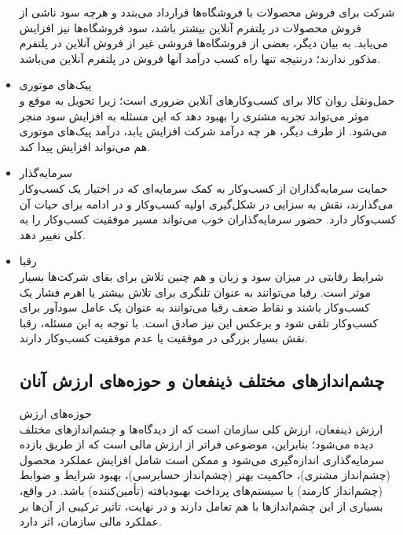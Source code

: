 \documentclass[14pt]{article}
\begin{document}
\begin{flushright}
\begin{itemize}
شرکت برای فروش محصولات با فروشگاه‌ها قرارداد می‌بندد و هرچه سود ناشی از فروش محصولات در پلتفرم آنلاین بیشتر باشد، سود فروشگاه‌ها نیز افزایش می‌یابد. به بیان دیگر، بعضی از فروشگاه‌ها فروشی غیر از فروش آنلاین در پلتفرم مذکور ندارند؛ درنتیجه تنها راه کسب درآمد آنها فروش در پلتفرم آنلاین می‌باشد.\\
\item پیک‌های موتوری\\ 
حمل‌و‌نقل روان کالا برای کسب‌وکار‌های آنلاین ضروری است؛ زیرا تحویل به موقع و موثر می‌تواند تجربه مشتری را بهبود دهد که این مسئله به افزایش سود منجر می‌شود. از طرف دیگر، هر چه درآمد شرکت افزایش یابد، درآمد پیک‌های موتوری هم می‌تواند افزایش پیدا کند.\\
\item سرمایه‌گذار\\
حمایت سرمایه‌گذاران از کسب‌وکار به کمک سرمایه‌ای که در اختیار یک کسب‌وکار می‌گذارند،‌ نقش به سزایی در شکل‌گیری اولیه کسب‌وکار و در ادامه برای حیات آن کسب‌وکار دارد. حضور سرمایه‌گذاران خوب می‌تواند مسیر موفقیت کسب‌وکار را به کلی تغییر دهد.\\
\item رقبا\\
شرایط رقابتی در میزان سود و زیان و هم چنین تلاش برای بقای شرکت‌ها بسیار موثر است. رقبا می‌توانند به عنوان تلنگری برای تلاش بیشتر یا اهرم فشار یک کسب‌وکار باشند و نقاط ضعف رقبا می‌توانند به عنوان یک عامل سود‌آور برای کسب‌وکار تلقی شود و برعکس این نیز صادق است. با توجه به این مسئله، رقبا نقش بسیار بزرگی در موفقیت یا عدم موفقیت کسب‌وکار دارند.\\




\subsection{چشم‌اندازهای مختلف ذینفعان و حوزه‌های ارزش آنان}

حوزه‌های ارزش\\

ارزش ذینفعان، ارزش کلی سازمان است که از دیدگاه‌ها و چشم‌اندازهای مختلف دیده می‌شود؛ بنابراین، موضوعی فراتر از ارزش مالی است که از طریق بازده سرمایه‌گذاری اندازه‌گیری می‌شود و ممکن است شامل افزایش عملکرد محصول (چشم‌انداز مشتری)، حاکمیت بهتر (چشم‌انداز حسابرسی)، بهبود شرایط و ضوابط (چشم‌انداز کارمند) یا سیستم‌های پرداخت بهبود‌یافته (تأمین‌کننده) باشد. در واقع، بسیاری از این چشم‌اندازها با هم تعامل دارند و در نهایت، تاثیر ترکیبی از آن‌ها بر عملکرد مالی سازمان، اثر دارد.\\


\end{itemize}
\end{flushright}
\end{document}
